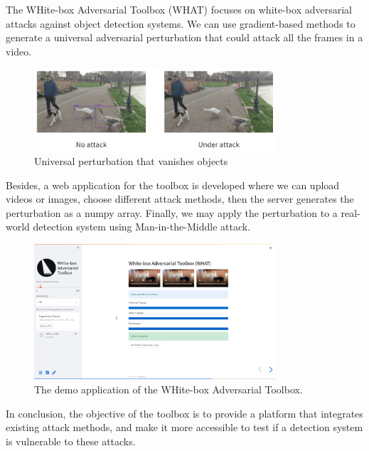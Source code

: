 The WHite-box Adversarial Toolbox (WHAT) focuses on white-box adversarial attacks against object detection systems. We can use gradient-based methods to generate a universal adversarial perturbation that could attack all the frames in a video.

\begin{figure}[H]
    \centering
    \includegraphics[width=0.8\textwidth]{figures/chapter_detection/what-attack.png}
    \caption{Universal perturbation that vanishes objects}
    \label{fig:what_attack}
\end{figure}

Besides, a web application for the toolbox is developed where we can upload videos or images, choose different attack methods, then the server generates the perturbation as a numpy array. Finally, we may apply the perturbation to a real-world detection system using Man-in-the-Middle attack.

\begin{figure}[H]
    \centering
    \includegraphics[width=0.8\textwidth]{figures/chapter_detection/what-app.png}
    \caption{The demo application of the WHite-box Adversarial Toolbox.}
    \label{fig:what_app}
\end{figure}

In conclusion, the objective of the toolbox is to provide a platform that integrates existing attack methods, and make it more accessible to test if a detection system is vulnerable to these attacks.

\clearpage

